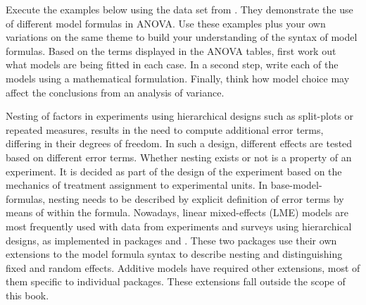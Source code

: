 \documentclass[krantz2]{krantz}\usepackage{knitr}
\begin{document}
\begin{playground}
Execute the examples below using the  data set from \Rlang. They demonstrate the use of different model formulas in ANOVA. Use these examples plus your own variations on the same theme to build your understanding of the syntax of model formulas. Based on the terms displayed in the ANOVA tables, first work out what models are being fitted in each case. In a second step, write each of the models using a mathematical formulation. Finally, think how model choice may affect the conclusions from an analysis of variance.

\begin{knitrout}\footnotesize
{}\color{fgcolor}
\end{knitrout}

\end{playground}

Nesting of factors in experiments using hierarchical designs such as split-plots or repeated measures, results in the need to compute additional error terms, differing in their degrees of freedom. In such a design, different effects are tested based on different error terms. Whether nesting exists or not is a property of an experiment. It is decided as part of the design of the experiment based on the mechanics of treatment assignment to experimental units. In base-\Rlang model-formulas, nesting needs to be described by explicit definition of error terms by means of  within the formula. Nowadays, linear mixed-effects (LME) models are most frequently used with data from experiments and surveys using hierarchical designs, as implemented in packages  and . These two packages use their own extensions to the model formula syntax to describe nesting and distinguishing fixed and random effects. Additive models have required other extensions, most of them specific to individual packages. These extensions fall outside the scope of this book.
\end{document}
